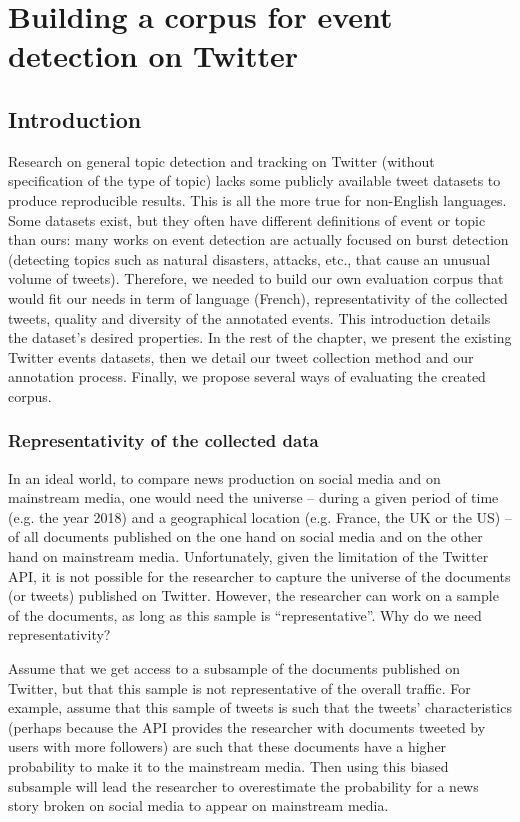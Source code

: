 \chapter{Building a corpus for event detection on Twitter}

\section{Introduction}

Research on general topic detection and tracking on Twitter (without specification of the type of topic) lacks some publicly available tweet datasets to produce reproducible results. This is all the more true for non-English languages. Some datasets exist, but they often have different definitions of event or topic than ours: many works on event detection are actually focused on  burst detection (detecting topics such as natural disasters, attacks, etc., that cause an unusual volume of tweets). Therefore, we needed to build our own evaluation corpus that would fit our needs in term of language (French), representativity of the collected tweets, quality and diversity of the annotated events. This introduction details the dataset's desired properties. In the rest of the chapter, we present the existing Twitter events datasets, then we detail our tweet collection method and our annotation process. Finally, we propose several ways of evaluating the created corpus.

\subsection{Representativity of the collected data}
In an ideal world, to compare news production on social media and on mainstream media, one would need the universe – during a given period of time (e.g. the year 2018) and a geographical location (e.g. France, the UK or the US) – of all documents published on the one hand on social media and on the other hand on mainstream media. Unfortunately, given the limitation of the Twitter API, it is not possible for the researcher to capture the universe of the documents (or tweets) published on Twitter. However, the researcher can work on a sample of the documents, as long as this sample is ``representative”. Why do we need representativity?


Assume that we get access to a subsample of the documents published on Twitter, but that this sample is not representative of the overall traffic. For example, assume that this sample of tweets is such that the tweets’ characteristics (perhaps because the API provides the researcher with documents tweeted by users with more followers) are such that these documents have a higher probability to make it to the mainstream media. Then using this biased subsample will lead the researcher to overestimate the probability for a news story broken on social media to appear on mainstream media.



